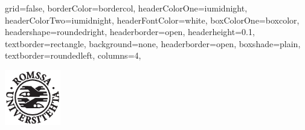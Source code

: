 \documentclass[fontscale=0.33,landscape,paperwidth=841mm,paperheight=1189mm]{baposter}  %
\begin{document}
	\setlength{\pdfpageheight}{\paperheight}
	\setlength{\pdfpagewidth}{\paperwidth}


	\begin{poster}{
		grid=false,
		borderColor=bordercol,
		headerColorOne=iumidnight,
		headerColorTwo=iumidnight,
		headerFontColor=white,
		boxColorOne=boxcolor,
		headershape=roundedright,
		headerborder=open,
		headerheight=0.1\textheight,
		textborder=rectangle,
		background=none,
		headerborder=open,
		boxshade=plain,
		textborder=roundedleft,
		columns=4,
	}{ %
		\includegraphics[height=6.5em]{uitlogo}
		\hspace{2.5cm}\begin{minipage}[t]{7em}
			\vspace{-2cm}
			\noindent\\
			\vspace{-0.5ex}\hspace{0.105cm}
		\end{minipage}

}
\end{poster}
\end{document}
